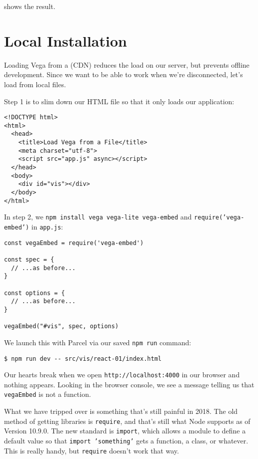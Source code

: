  shows the result.


\section{Local Installation}\label{s:vis-vega-local}

Loading Vega from a  (CDN) reduces the load on our server,
but prevents offline development.
Since we want to be able to work when we're disconnected,
let's load from local files.

Step 1 is to slim down our HTML file so that it only loads our application:

\begin{verbatim}
<!DOCTYPE html>
<html>
  <head>
    <title>Load Vega from a File</title>
    <meta charset="utf-8">
    <script src="app.js" async></script>
  </head>
  <body>
    <div id="vis"></div>
  </body>
</html>
\end{verbatim}

\noindent
In step 2,
we \texttt{npm\ install\ vega\ vega-lite\ vega-embed} and \texttt{require('vega-embed')} in \texttt{app.js}:

\begin{verbatim}
const vegaEmbed = require('vega-embed')

const spec = {
  // ...as before...
}

const options = {
  // ...as before...
}

vegaEmbed("#vis", spec, options)
\end{verbatim}

\noindent
We launch this with Parcel via our saved \texttt{npm\ run} command:

\begin{verbatim}
$ npm run dev -- src/vis/react-01/index.html
\end{verbatim}

Our hearts break when we open \texttt{http://localhost:4000} in our browser and nothing appears.
Looking in the browser console,
we see a message telling us that \texttt{vegaEmbed} is not a function.

What we have tripped over is something that's still painful in 2018.
The old method of getting libraries is \texttt{require},
and that's still what Node supports as of Version 10.9.0.
The new standard is \texttt{import},
which allows a module to define a default value so that \texttt{import\ 'something'} gets a function, a class, or whatever.
This is really handy, but \texttt{require} doesn't work that way.

